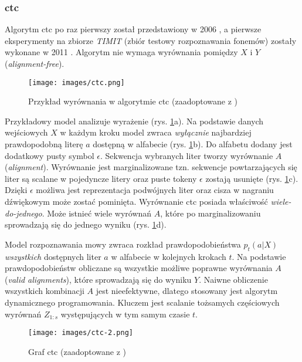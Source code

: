 \subsubsection*{\acrfull{ctc}}
Algorytm \acrshort{ctc} po raz pierwszy został przedstawiony w 2006 \cite{ctc}, a pierwsze eksperymenty na zbiorze \textit{TIMIT} (zbiór testowy rozpoznawania fonemów) zostały wykonane w 2011 \cite{ctc-first-imp}. Algorytm nie wymaga wyrównania pomiędzy $X$ i $Y$ (\textit{alignment-free}). 

\begin{figure}
    \centering
    \texttt{[image: images/ctc.png]}
    \caption{Przykład wyrównania w algorytmie \acrshort{ctc} (zaadoptowane z \cite{ctc-distil})}
    \label{fig:ctc}
\end{figure}

Przykładowy model analizuje wyrażenie  (rys. \ref{fig:ctc}a). Na podstawie danych wejściowych $X$ w każdym kroku model zwraca \emph{wyłącznie} najbardziej prawdopodobną literę $a$ dostępną w alfabecie (rys. \ref{fig:ctc}b). Do alfabetu dodany jest dodatkowy pusty symbol $\epsilon$. Sekwencja wybranych liter tworzy wyrównanie $A$ (\textit{alignment}). Wyrównanie jest marginalizowane tzn. sekwencje powtarzających się liter są scalane w pojedyncze litery oraz puste tokeny $\epsilon$ zostają usunięte (rys. \ref{fig:ctc}c). Dzięki $\epsilon$ możliwa jest reprezentacja podwójnych liter oraz cisza w nagraniu dźwiękowym może zostać pominięta. Wyrównanie \acrshort{ctc} posiada właściwość \emph{wiele-do-jednego}. Może istnieć wiele wyrównań $A$, które po marginalizowaniu sprowadzają się do jednego wyniku (rys. \ref{fig:ctc}d). 

Model rozpoznawania mowy zwraca rozkład prawdopodobieństwa $p_t(a|X)$ \emph{wszystkich} dostępnych liter $a$ w alfabecie w kolejnych krokach $t$. Na podstawie prawdopodobieństw obliczane są wszystkie możliwe poprawne wyrównania $A$ (\textit{valid alignments}), które sprowadzają się do wyniku $Y$. Naiwne obliczenie wszystkich kombinacji $A$ jest nieefektywne, dlatego stosowany jest algorytm dynamicznego programowania. Kluczem jest scalanie tożsamych częściowych wyrównań $Z_{1:s}$ występujących w tym samym czasie $t$.  

\begin{figure}
    \centering
    \texttt{[image: images/ctc-2.png]}
    \caption{Graf \acrshort{ctc} (zaadoptowane z \cite{ctc-distil})}
    \label{fig:ctc_2}
\end{figure}

